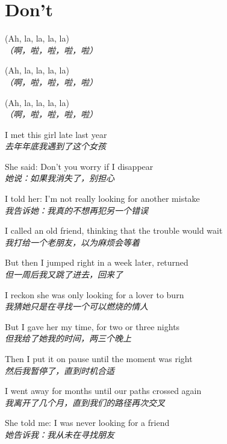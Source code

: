 \section{Don't}

\thispagestyle{empty}


\begin{spacing}{1.5}
\begin{flushleft}
(Ah, la, la, la, la)\\
\textit{（啊，啦，啦，啦，啦）}\lyricspace

(Ah, la, la, la, la)\\
\textit{（啊，啦，啦，啦，啦）}\lyricspace

(Ah, la, la, la, la)\\
\textit{（啊，啦，啦，啦，啦）}\lyricspace

I met this girl late last year\\
\textit{去年年底我遇到了这个女孩}\lyricspace

She said: Don't you worry if I disappear\\
\textit{她说：如果我消失了，别担心}\lyricspace

I told her: I'm not really looking for another mistake\\
\textit{我告诉她：我真的不想再犯另一个错误}\lyricspace

I called an old friend, thinking that the trouble would wait\\
\textit{我打给一个老朋友，以为麻烦会等着}\lyricspace

But then I jumped right in a week later, returned\\
\textit{但一周后我又跳了进去，回来了}\lyricspace

I reckon she was only looking for a lover to burn\\
\textit{我猜她只是在寻找一个可以燃烧的情人}\lyricspace

But I gave her my time, for two or three nights\\
\textit{但我给了她我的时间，两三个晚上}\lyricspace

Then I put it on pause until the moment was right\\
\textit{然后我暂停了，直到时机合适}\lyricspace

I went away for months until our paths crossed again\\
\textit{我离开了几个月，直到我们的路径再次交叉}\lyricspace

She told me: I was never looking for a friend\\
\textit{她告诉我：我从未在寻找朋友}\lyricspace


\end{flushleft}
\end{spacing}
